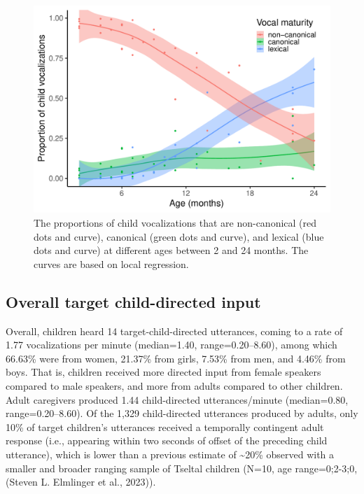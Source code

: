 \documentclass[
  man]{apa6}
\begin{document}
\begin{figure}
\centering
\includegraphics{turntaking_paper_files/figure-latex/vcm-trajectories-plot-1.pdf}
\caption{\label{fig:vcm-trajectories-plot}The proportions of child vocalizations that are non-canonical (red dots and curve), canonical (green dots and curve), and lexical (blue dots and curve) at different ages between 2 and 24 months. The curves are based on local regression.}
\end{figure}

\hypertarget{overall-target-child-directed-input}{%
\subsection{Overall target child-directed input}\label{overall-target-child-directed-input}}

Overall, children heard 14 target-child-directed utterances, coming to a rate of 1.77 vocalizations per minute (median=1.40, range=0.20--8.60), among which 66.63\% were from women, 21.37\% from girls, 7.53\% from men, and 4.46\% from boys. That is, children received more directed input from female speakers compared to male speakers, and more from adults compared to other children. Adult caregivers produced 1.44 child-directed utterances/minute (median=0.80, range=0.20--8.60). Of the 1,329 child-directed utterances produced by adults, only 10\% of target children's utterances received a temporally contingent adult response (i.e., appearing within two seconds of offset of the preceding child utterance), which is lower than a previous estimate of \textasciitilde20\% observed with a smaller and broader ranging sample of Tseltal children (N=10, age range=0;2-3;0, (Steven L. Elmlinger et al., 2023)).
\end{document}

